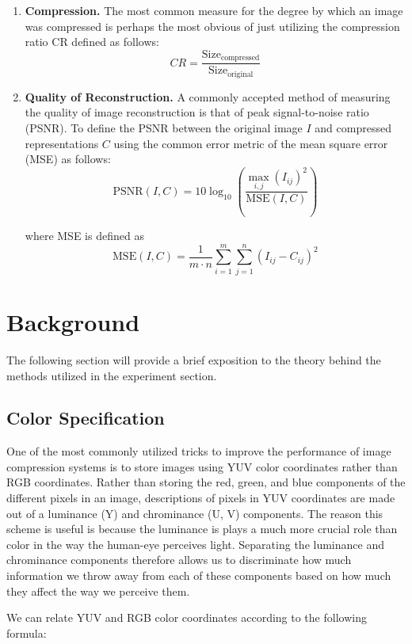 \documentclass[review,onefignum,onetabnum]{siamart190516}
\begin{document}
\begin{enumerate}[label=\textbf{(\alph*)}]
  \item \textbf{Compression.} The most common measure for the degree by which an
  image was compressed is perhaps the most obvious of just utilizing the compression
  ratio CR defined as follows\cite{sayood2017introduction}:
  \[
    CR = \frac{\text{Size}_\text{compressed}}{\text{Size}_\text{original}}
  \]
  \item \textbf{Quality of Reconstruction.} A commonly accepted method of measuring
  the quality of image reconstruction is that of peak signal-to-noise ratio (PSNR).
  To define the PSNR between the original image $I$ and compressed representations $C$
  using the common error metric of the mean square error (MSE) as follows:
  \[
    \text{PSNR}(I, C) = 10 \log_{10}(\frac{\max_{i, j}(I_{ij})^2}{\text{MSE}(I, C)})
  \]

  where MSE is defined as
  \[
    \text{MSE}(I, C) = \frac{1}{m \cdot n} \sum_{i = 1}^m \sum_{j = 1}^n (I_{ij} - C_{ij})^2
  \]
\end{enumerate}

\section{Background}
The following section will provide a brief exposition to the theory behind the methods
utilized in the experiment section.

\subsection{Color Specification}
One of the most commonly utilized tricks to improve the performance of image compression
systems is to store images using YUV color coordinates rather than RGB coordinates.
Rather than storing the red, green, and blue components of the different pixels in 
an image, descriptions of pixels in YUV coordinates are made out of a luminance (Y)
and chrominance (U, V) components. The reason this scheme is useful is because the
luminance is plays a much more crucial role than color in the way the human-eye 
perceives light. Separating the luminance and chrominance components therefore allows
us to discriminate how much information we throw away from each of these components
based on how much they affect the way we perceive them. \cite{podpora2014yuv}

We can relate YUV and RGB color coordinates according to the following formula:
\end{document}
